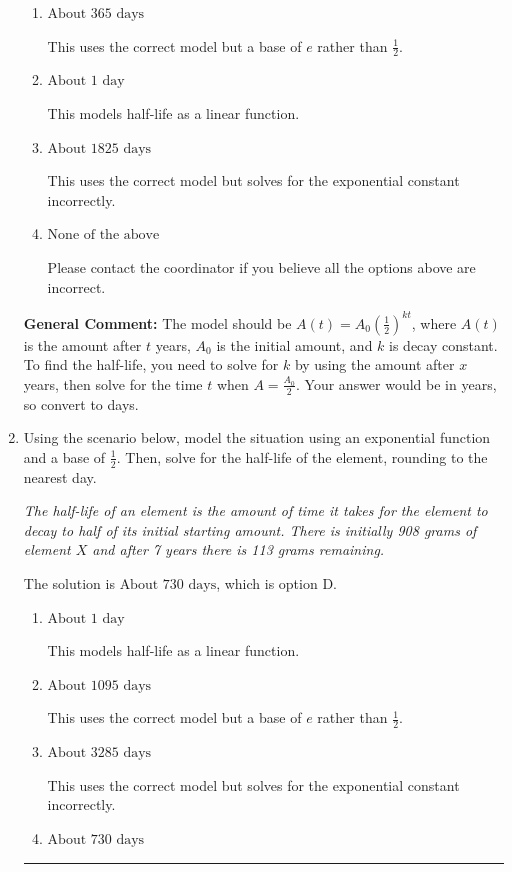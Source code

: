 \documentclass{extbook}[14pt]
\newcommand{\litem}[1]{\item #1

\rule{\textwidth}{0.4pt}}
\begin{document}
\begin{enumerate}
{\begin{enumerate}[label=\Alph*.]
* This is the correct option.
\item \( \text{About } 365 \text{ days} \)

This uses the correct model but a base of $e$ rather than $\frac{1}{2}$.
\item \( \text{About } 1 \text{ day} \)

This models half-life as a linear function.
\item \( \text{About } 1825 \text{ days} \)

This uses the correct model but solves for the exponential constant incorrectly.
\item \( \text{None of the above} \)

Please contact the coordinator if you believe all the options above are incorrect.
\end{enumerate}

\textbf{General Comment:} The model should be $A(t) = A_0 (\frac{1}{2})^{kt}$, where $A(t)$ is the amount after $t$ years, $A_0$ is the initial amount, and $k$ is decay constant. To find the half-life, you need to solve for $k$ by using the amount after $x$ years, then solve for the time $t$ when $A = \frac{A_0}{2}$. Your answer would be in years, so convert to days.
}
\litem{
Using the scenario below, model the situation using an exponential function and a base of $\frac{1}{2}$. Then, solve for the half-life of the element, rounding to the nearest day.

\begin{center}
    \textit{ The half-life of an element is the amount of time it takes for the element to decay to half of its initial starting amount. There is initially 908 grams of element $X$ and after 7 years there is 113 grams remaining. }
\end{center}
The solution is \( \text{About } 730 \text{ days} \), which is option D.\begin{enumerate}[label=\Alph*.]
\item \( \text{About } 1 \text{ day} \)

This models half-life as a linear function.
\item \( \text{About } 1095 \text{ days} \)

This uses the correct model but a base of $e$ rather than $\frac{1}{2}$.
\item \( \text{About } 3285 \text{ days} \)

This uses the correct model but solves for the exponential constant incorrectly.
\item \( \text{About } 730 \text{ days} \)


\end{enumerate}}
\end{enumerate}
\end{document}
